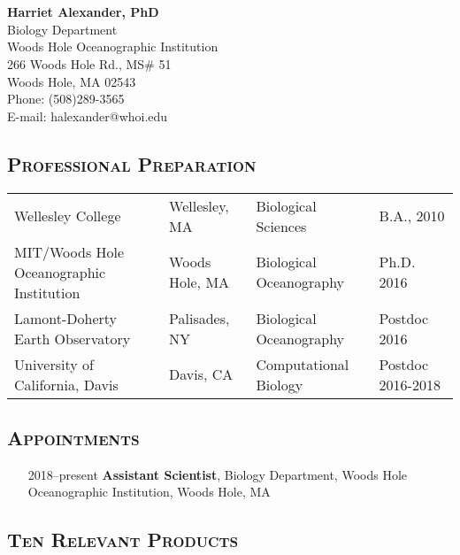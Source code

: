 \documentclass[svgnames,11pt]{article}
\date{}
\author{}
\begin{document}

\section*{}
\textbf{\large{Harriet Alexander, PhD}}\\
Biology Department\\
Woods Hole Oceanographic Institution\\
266 Woods Hole Rd., MS\# 51\\
Woods Hole, MA 02543\\
Phone: (508)289-3565\\
E-mail: halexander@whoi.edu\\


\subsection*{\textsc{Professional Preparation}}

\begin{tabular}{ l l l l }
 Wellesley College & Wellesley, MA & Biological Sciences & B.A., 2010 \\
 MIT/Woods Hole Oceanographic Institution  & Woods Hole, MA & Biological Oceanography & Ph.D. 2016 \\
 Lamont-Doherty Earth Observatory & Palisades, NY & Biological Oceanography & Postdoc 2016 \\
 University of California, Davis & Davis, CA & Computational Biology & Postdoc 2016-2018 \\
\end{tabular}

\subsection*{\textsc{Appointments}}

\begin{itemize}[label={--9999:},leftmargin=*,itemsep=0pt]

    \item[2018--present ]
        \textbf{Assistant Scientist},
        Biology Department, Woods Hole Oceanographic Institution, Woods Hole, MA

\end{itemize}

\subsection*{\textsc{Ten Relevant Products}}
\vspace*{-1cm}
\renewcommand\refname{}
\end{document}
